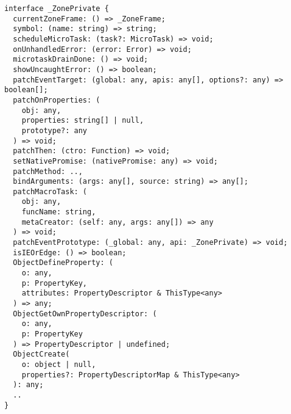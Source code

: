 \begin{verbatim}
interface _ZonePrivate {
  currentZoneFrame: () => _ZoneFrame;
  symbol: (name: string) => string;
  scheduleMicroTask: (task?: MicroTask) => void;
  onUnhandledError: (error: Error) => void;
  microtaskDrainDone: () => void;
  showUncaughtError: () => boolean;
  patchEventTarget: (global: any, apis: any[], options?: any) => boolean[];
  patchOnProperties: (
    obj: any,
    properties: string[] | null,
    prototype?: any
  ) => void;
  patchThen: (ctro: Function) => void;
  setNativePromise: (nativePromise: any) => void;
  patchMethod: ..,
  bindArguments: (args: any[], source: string) => any[];
  patchMacroTask: (
    obj: any,
    funcName: string,
    metaCreator: (self: any, args: any[]) => any
  ) => void;
  patchEventPrototype: (_global: any, api: _ZonePrivate) => void;
  isIEOrEdge: () => boolean;
  ObjectDefineProperty: (
    o: any,
    p: PropertyKey,
    attributes: PropertyDescriptor & ThisType<any>
  ) => any;
  ObjectGetOwnPropertyDescriptor: (
    o: any,
    p: PropertyKey
  ) => PropertyDescriptor | undefined;
  ObjectCreate(
    o: object | null,
    properties?: PropertyDescriptorMap & ThisType<any>
  ): any;
  ..
}
\end{verbatim}
